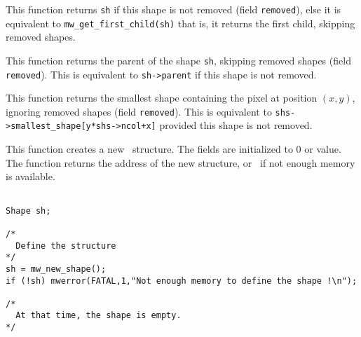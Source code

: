 \newpage %


\Description
This function returns \verb+sh+ if this shape is not removed (field
\verb+removed+), else it is equivalent to \verb+mw_get_first_child(sh)+ that
is, it returns the first child, skipping removed shapes.

\newpage %


\Description
This function returns the parent of
the shape \verb+sh+, skipping removed shapes (field \verb+removed+). This
is equivalent to \verb+sh->parent+ if this shape is not removed.


\newpage %



\Description
This function returns the smallest shape containing the pixel at position
$(x,y)$, ignoring removed shapes (field \verb+removed+). This is equivalent
to \verb!shs->smallest_shape[y*shs->ncol+x]! provided this shape is not
removed.

\newpage %


\Description
This function creates a new \shape\ structure. The fields are initialized
to $0$ or \Null value.
The function returns the address of the new structure, or
\Null\ if not enough memory is available.

\Next
\Example
\begin{verbatim}

Shape sh;

/*
  Define the structure
*/
sh = mw_new_shape();
if (!sh) mwerror(FATAL,1,"Not enough memory to define the shape !\n");

/* 
  At that time, the shape is empty.
*/
\end{verbatim}

\newpage %


